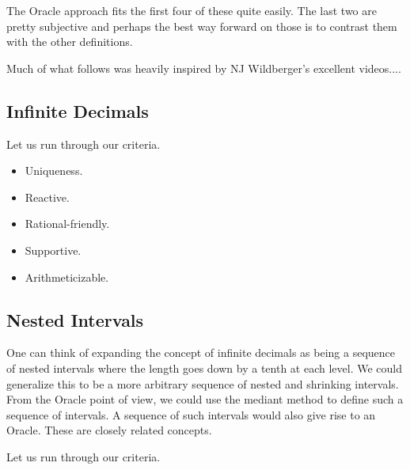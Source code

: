 \documentclass[12pt]{article}
\theoremstyle{remark}
\begin{document}
The Oracle approach fits the first four of these quite easily. The last two are pretty subjective and perhaps the best way forward on those is to contrast them with the other definitions. 

Much of what follows was heavily inspired by NJ Wildberger's excellent videos....


\subsection{Infinite Decimals}

Let us run through our criteria. 

\begin{itemize}
    \item Uniqueness.
    \item Reactive. 
    \item Rational-friendly. 
    \item Supportive. 
    \item Arithmeticizable. 
\end{itemize}

\subsection{Nested Intervals}

One can think of expanding the concept of infinite decimals as being a sequence of nested intervals where the length goes down by a tenth at each level. We could generalize this to be a more arbitrary sequence of nested and shrinking intervals. From the Oracle point of view, we could use the mediant method to define such a sequence of intervals. A sequence of such intervals would also give rise to an Oracle. These are closely related concepts. 

Let us run through our criteria. 
\end{document}
